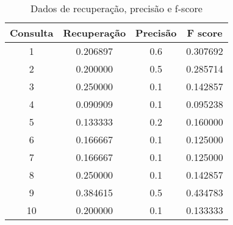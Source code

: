 \begin{table}
\centering
\caption{Dados de recuperação, precisão e f-score }
\label{tab:fscorenir}
\begin{tabular}{cccc}
\toprule
Consulta &  Recuperação &  Precisão &   F score \\
\midrule
1 &     0.206897 &       0.6 &  0.307692 \\
2 &     0.200000 &       0.5 &  0.285714 \\
3 &     0.250000 &       0.1 &  0.142857 \\
4 &     0.090909 &       0.1 &  0.095238 \\
5 &     0.133333 &       0.2 &  0.160000 \\
6 &     0.166667 &       0.1 &  0.125000 \\
7 &     0.166667 &       0.1 &  0.125000 \\
8 &     0.250000 &       0.1 &  0.142857 \\
9 &     0.384615 &       0.5 &  0.434783 \\
10 &     0.200000 &       0.1 &  0.133333 \\
\bottomrule
\end{tabular}
\end{table}
